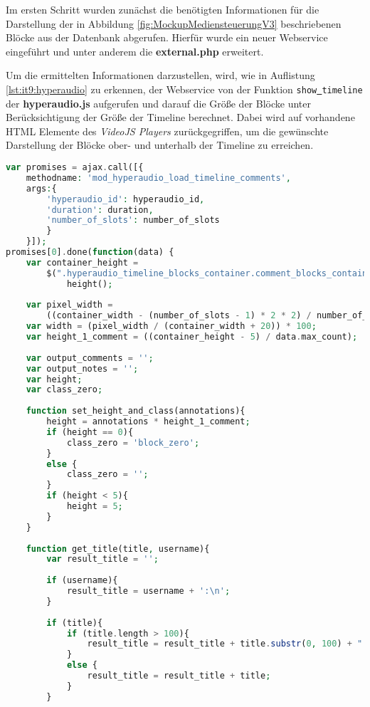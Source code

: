 Im ersten Schritt wurden zunächst die benötigten Informationen für die Darstellung der in Abbildung \ref{fig:MockupMediensteuerungV3} beschriebenen Blöcke aus der Datenbank abgerufen. Hierfür wurde ein neuer Webservice eingeführt und unter anderem  die \textbf{external.php} erweitert.

Um die ermittelten Informationen darzustellen, wird, wie in Auflistung \ref{lst:it9:hyperaudio} zu erkennen, der Webservice von der Funktion \texttt{show\underline{{ }}timeline} der \textbf{hyperaudio.js} aufgerufen und darauf die Größe der Blöcke unter Berücksichtigung der Größe der Timeline berechnet. Dabei wird auf vorhandene HTML Elemente des \textit{VideoJS Players} zurückgegriffen, um die gewünschte Darstellung der Blöcke ober- und unterhalb der Timeline zu erreichen.

\begin{lstlisting}[language=php,
             linewidth=\textwidth,
             caption={Ausschnitt der \textbf{hyperaudio.js} in der 9. Iteration},
             label={lst:it9:hyperaudio}]
var promises = ajax.call([{
    methodname: 'mod_hyperaudio_load_timeline_comments',
    args:{
        'hyperaudio_id': hyperaudio_id,
        'duration': duration,
        'number_of_slots': number_of_slots
        }
    }]);
promises[0].done(function(data) {
    var container_height =
        $(".hyperaudio_timeline_blocks_container.comment_blocks_container").
            height();
		    	
    var pixel_width = 
        ((container_width - (number_of_slots - 1) * 2 * 2) / number_of_slots);
    var width = (pixel_width / (container_width + 20)) * 100;
    var height_1_comment = ((container_height - 5) / data.max_count);
		    	
    var output_comments = '';
    var output_notes = '';
    var height;
    var class_zero;
		    	
    function set_height_and_class(annotations){
        height = annotations * height_1_comment;
        if (height == 0){
            class_zero = 'block_zero';
        }
        else {
            class_zero = '';
        }
        if (height < 5){
            height = 5;
        }
    }
		    	
    function get_title(title, username){
        var result_title = '';
		    		
        if (username){
            result_title = username + ':\n';
        }
		    		
        if (title){
            if (title.length > 100){
                result_title = result_title + title.substr(0, 100) + " ...";
            }
            else {
                result_title = result_title + title;
            }
        }
		    		

\end{lstlisting}

